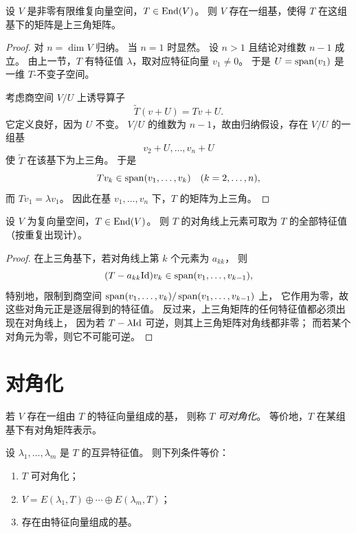 \begin{theorem}
设 $V$ 是非零有限维复向量空间，$T\in\mathrm{End}(V)$。
则 $V$ 存在一组基，使得 $T$ 在这组基下的矩阵是上三角矩阵。
\end{theorem}

\begin{proof}
对 $n=\dim V$ 归纳。
当 $n=1$ 时显然。
设 $n>1$ 且结论对维数 $n-1$ 成立。
由上一节，$T$ 有特征值 $\lambda$，取对应特征向量 $v_1\neq 0$。
于是 $U=\operatorname{span}(v_1)$ 是一维 $T$-不变子空间。

考虑商空间 $V/U$ 上诱导算子
\[
\widetilde T(v+U)=Tv+U.
\]
它定义良好，因为 $U$ 不变。
$V/U$ 的维数为 $n-1$，故由归纳假设，存在 $V/U$ 的一组基
\[
v_2+U,\dots,v_n+U
\]
使 $\widetilde T$ 在该基下为上三角。
于是
\[
Tv_k\in \operatorname{span}(v_1,\dots,v_k)
\quad (k=2,\dots,n),
\]
而 $Tv_1=\lambda v_1$。
因此在基 $v_1,\dots,v_n$ 下，$T$ 的矩阵为上三角。
\end{proof}

\begin{corollary}
设 $V$ 为复向量空间，$T\in\mathrm{End}(V)$。
则 $T$ 的对角线上元素可取为 $T$ 的全部特征值（按重复出现计）。
\end{corollary}

\begin{proof}
在上三角基下，若对角线上第 $k$ 个元素为 $a_{kk}$，
则
\[
(T-a_{kk}\mathrm{Id})v_k\in \operatorname{span}(v_1,\dots,v_{k-1}),
\]
特别地，限制到商空间 $\operatorname{span}(v_1,\dots,v_k)/\operatorname{span}(v_1,\dots,v_{k-1})$ 上，
它作用为零，故这些对角元正是逐层得到的特征值。
反过来，上三角矩阵的任何特征值都必须出现在对角线上，
因为若 $T-\lambda\mathrm{Id}$ 可逆，则其上三角矩阵对角线都非零；
而若某个对角元为零，则它不可能可逆。
\end{proof}

\section{对角化}

\begin{definition}
若 $V$ 存在一组由 $T$ 的特征向量组成的基，
则称 $T$ \emph{可对角化}。
等价地，$T$ 在某组基下有对角矩阵表示。
\end{definition}

\begin{theorem}
设 $\lambda_1,\dots,\lambda_m$ 是 $T$ 的互异特征值。
则下列条件等价：
\begin{enumerate}[label=(\alph*)]
\item $T$ 可对角化；
\item $V=E(\lambda_1,T)\oplus\cdots\oplus E(\lambda_m,T)$；
\item 存在由特征向量组成的基。
\end{enumerate}
\end{theorem}

